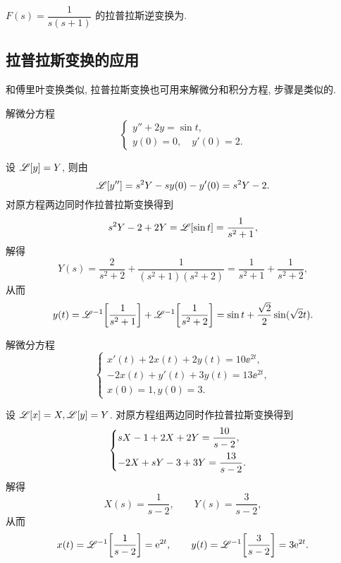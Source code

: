 \begin{exercise}
  $F(s)=\dfrac1{s(s+1)}$ 的拉普拉斯逆变换为\fillblank{}.
\end{exercise}



\subsection{拉普拉斯变换的应用}

和傅里叶变换类似, 拉普拉斯变换也可用来解微分和积分方程, 步骤是类似的.

\begin{example}
  解微分方程
  \[
    \begin{cases}
      y''+2y=\sin t,\\
      y(0)=0,\quad y'(0)=2.
    \end{cases}
  \]
\end{example}

\begin{solution}
  设 $\mathscr{L}[y]=Y$, 则由\thmLDif
  \[
     \mathscr{L}[y'']
    =s^2Y-sy(0)-y'(0)
    =s^2Y-2.
  \]
  对原方程两边同时作拉普拉斯变换得到
  \[
     s^2Y-2+2Y
    =\mathscr{L}[\sin t]
    =\frac{1}{s^2+1},
  \]
  解得
  \[
     Y(s)
    =\frac{2}{s^2+2}+\frac{1}{(s^2+1)(s^2+2)}
    =\frac{1}{s^2+1}+\frac{1}{s^2+2},
  \]
  从而
  \[
     y(t)
    =\mathscr{L}^{-1}\biggl[\frac{1}{s^2+1}\biggr]+\mathscr{L}^{-1}\biggl[\frac{1}{s^2+2}\biggr]
    =\sin t+\frac{\sqrt 2}2\sin(\sqrt 2 t).
  \]
\end{solution}

\begin{example}
  解微分方程
  \[
    \begin{cases}
      x'(t)+2x(t)+2y(t)=10\ee^{2t}, \\
      -2x(t)+y'(t)+3y(t)=13\ee^{2t}, \\
      x(0)=1,y(0)=3.
    \end{cases}
  \]
\end{example}

\begin{solution}
  设 $\mathscr{L}[x]=X,\mathscr{L}[y]=Y$.
  对原方程组两边同时作拉普拉斯变换得到
  \[
    \begin{cases}
      sX-1+2X+2Y=\dfrac{10}{s-2},\\[2\itemsep]
      -2X+sY-3+3Y=\dfrac{13}{s-2}.
    \end{cases}
  \]
  解得
  \[
    X(s)=\frac1{s-2},\qquad 
    Y(s)=\frac3{s-2},
  \]
  从而
  \[
     x(t)
    =\mathscr{L}^{-1}\biggl[\frac1{s-2}\biggr]
    =\mathrm{e}^{2t},\qquad
     y(t)
    =\mathscr{L}^{-1}\biggl[\frac3{s-2}\biggr]
    =3\mathrm{e}^{2t}.
  \]
\end{solution}

